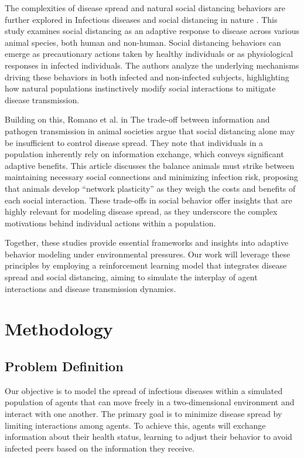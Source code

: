 \documentclass[9pt]{IEEEtran}
\begin{document}
The complexities of disease spread and natural social distancing behaviors are further explored in Infectious diseases and social distancing in nature \cite{stockmaier2021infectious}. This study examines social distancing as an adaptive response to disease across various animal species, both human and non-human. Social distancing behaviors can emerge as precautionary actions taken by healthy individuals or as physiological responses in infected individuals. The authors analyze the underlying mechanisms driving these behaviors in both infected and non-infected subjects, highlighting how natural populations instinctively modify social interactions to mitigate disease transmission.

Building on this, Romano et al. in The trade-off between information and pathogen transmission in animal societies \cite{romano2022tradeoff} argue that social distancing alone may be insufficient to control disease spread. They note that individuals in a population inherently rely on information exchange, which conveys significant adaptive benefits. This article discusses the balance animals must strike between maintaining necessary social connections and minimizing infection risk, proposing that animals develop “network plasticity” as they weigh the costs and benefits of each social interaction. These trade-offs in social behavior offer insights that are highly relevant for modeling disease spread, as they underscore the complex motivations behind individual actions within a population.

Together, these studies provide essential frameworks and insights into adaptive behavior modeling under environmental pressures. Our work will leverage these principles by employing a reinforcement learning model that integrates disease spread and social distancing, aiming to simulate the interplay of agent interactions and disease transmission dynamics.

\section{Methodology}

\subsection{Problem Definition}

Our objective is to model the spread of infectious diseases within a simulated population of agents that can move freely in a two-dimensional environment and interact with one another. The primary goal is to minimize disease spread by limiting interactions among agents. To achieve this, agents will exchange information about their health status, learning to adjust their behavior to avoid infected peers based on the information they receive.
\end{document}
